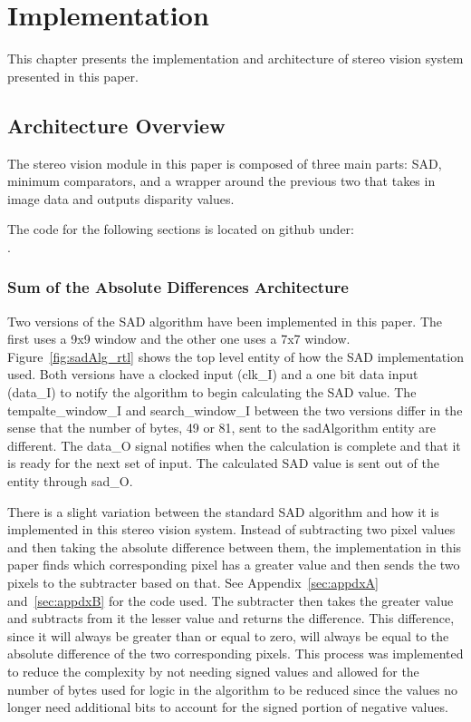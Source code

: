 \chapter{Implementation}
\label{sec:impl}

This chapter presents the implementation and architecture of stereo vision system presented in this paper.

\section{Architecture Overview}

The stereo vision module in this paper is composed of three main parts: SAD, minimum comparators, and a wrapper around the previous two that takes in image data and outputs disparity values.

The code for the following sections is located on github under:
\\.

\subsection{Sum of the Absolute Differences Architecture}

Two versions of the SAD algorithm have been implemented in this paper. The first uses a 9x9 window and the other one uses a 7x7 window. Figure~\ref{fig:sadAlg_rtl} shows the top level entity of how the SAD implementation used. Both versions have a clocked input (clk\_I) and a one bit data input (data\_I) to notify the algorithm to begin calculating the SAD value. The tempalte\_window\_I and search\_window\_I between the two versions differ in the sense that the number of bytes, 49 or 81, sent to the sadAlgorithm entity are different. The data\_O signal notifies when the calculation is complete and that it is ready for the next set of input. The calculated SAD value is sent out of the entity through sad\_O.

There is a slight variation between the standard SAD algorithm and how it is implemented in this stereo vision system. Instead of subtracting two pixel values and then taking the absolute difference between them, the implementation in this paper finds which corresponding pixel has a greater value and then sends the two pixels to the subtracter based on that. See Appendix~\ref{sec:appdxA} and~\ref{sec:appdxB} for the code used. The subtracter then takes the greater value and subtracts from it the lesser value and returns the difference. This difference, since it will always be greater than or equal to zero, will always be equal to the absolute difference of the two corresponding pixels. This process was implemented to reduce the complexity by not needing signed values and allowed for the number of bytes used for logic in the algorithm to be reduced since the values no longer need additional bits to account for the signed portion of negative values.

